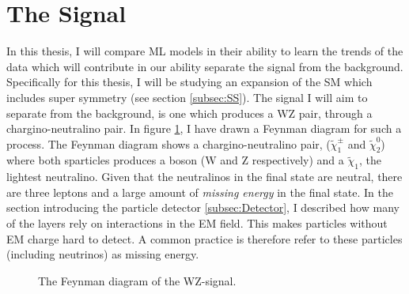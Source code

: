 \section{The Signal}\label{sec:signal}
In this thesis, I will compare \ac{ML} models in their ability to learn the trends of the data which will contribute  
in our ability separate the signal from the background. Specifically for this thesis, I will be studying an expansion of the 
\ac{SM} which includes super symmetry (see section \ref{subsec:SS}). The signal I will aim to separate from the background, is one 
which produces a WZ pair, through a chargino-neutralino pair. In figure \ref{fig:signal}, I have drawn a Feynman diagram for 
such a process. The Feynman diagram shows a chargino-neutralino pair, ($\tilde{\chi}_1^\pm$ and $\tilde{\chi}^0_2$)
where both sparticles produces a boson (W and Z respectively) and a $\tilde{\chi}_1$, the lightest neutralino. Given that the 
neutralinos in the final state are neutral, there are three leptons and a large amount of \emph{missing energy} in the final state.
In the section introducing the particle detector \ref{subsec:Detector}, I described how many of the layers rely on interactions in 
the \ac{EM} field. This makes particles without \ac{EM} charge hard to detect. A common practice is therefore refer to these particles 
(including neutrinos) as missing energy.
\begin{figure}
    \centering
    \caption{The Feynman diagram of the WZ-signal.}
    \label{fig:signal}
\end{figure}